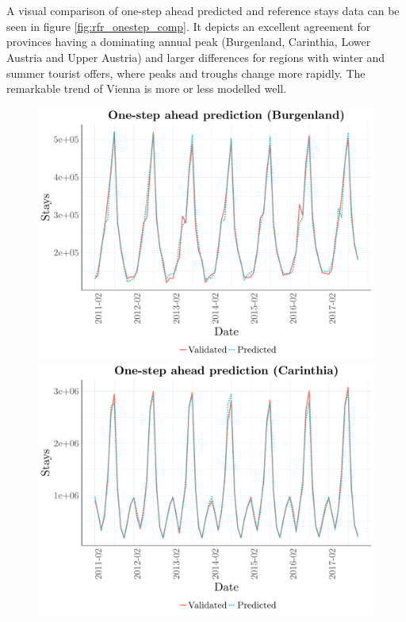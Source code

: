 \documentclass[a4paper,reqno,]{article}
\begin{document}
\\
\\
A visual comparison of one-step ahead predicted and reference stays data can be seen in figure \ref{fig:rfr_onestep_comp}. 
It depicts an excellent agreement for provinces having a dominating annual peak (Burgenland, Carinthia, Lower Austria and Upper Austria) and larger differences for regions with winter and summer tourist offers, where peaks and troughs change more rapidly. The remarkable trend of Vienna is more or less modelled well. 
\begin{figure}[h!]
\begin{minipage}[h!]{0.33\textwidth}
\centering
    \includegraphics[width=1\textwidth]{images/RFR/Burgenland_one_step_ahead.pdf}
\end{minipage}
\begin{minipage}[h!]{0.33\textwidth}
\centering
    \includegraphics[width=1\textwidth]{images/RFR/Carinthia_one_step_ahead.pdf}

\end{minipage}
\end{figure}
\end{document}
